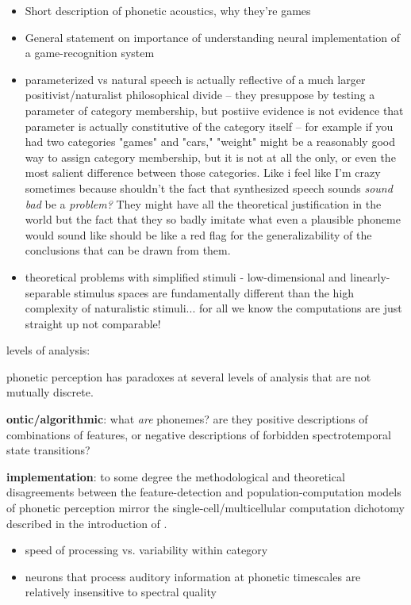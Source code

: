 \begin{multicols}{2}
\begin{itemize}
	\item Short description of phonetic acoustics, why they're games
	\item General statement on importance of understanding neural implementation of a game-recognition system
	\item parameterized vs natural speech is actually reflective of a much larger positivist/naturalist philosophical divide -- they presuppose by testing a parameter of category membership, but postiive evidence is not evidence that parameter is actually constitutive of the category itself -- for example if you had two categories "games" and "cars," "weight" might be a reasonably good way to assign category membership, but it is not at all the only, or even the most salient difference between those categories. Like i feel like I'm crazy sometimes because shouldn't the fact that synthesized speech sounds \textit{sound bad} be a \textit{problem?} They might have all the theoretical justification in the world but the fact that they so badly imitate what even a plausible phoneme would sound like should be like a red flag for the generalizability of the conclusions that can be drawn from them.
	\item theoretical problems with simplified stimuli - low-dimensional and linearly-separable stimulus spaces are fundamentally different than the high complexity of naturalistic stimuli... for all we know the computations are just straight up not comparable! \cite{schuesslerInterplayRandomnessStructure2020}

\end{itemize}


levels of analysis:

phonetic perception has paradoxes at several levels of analysis that are not mutually discrete.

\textbf{ontic/algorithmic}: what \textit{are} phonemes? are they positive descriptions of combinations of features, or negative descriptions of forbidden spectrotemporal state transitions?

\textbf{implementation}: to some degree the methodological and theoretical disagreements between the feature-detection and population-computation models of phonetic perception mirror the single-cell/multicellular computation dichotomy described in the introduction of \cite{dubreuilComplementaryRolesDimensionality2020}. 

\begin{itemize}
	\item speed of processing vs. variability within category
	\item neurons that process auditory information at phonetic timescales are relatively insensitive to spectral quality \cite{norman-haignereHierarchicalIntegrationMultiple2020}
\end{itemize}

\end{multicols}

% 